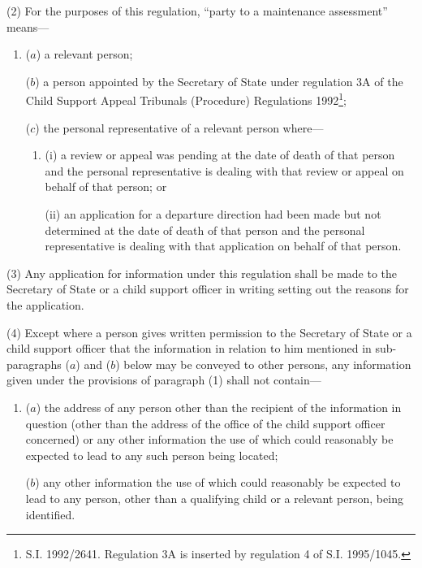 \documentclass[a4paper]{article}
\begin{document}
(2) For the purposes of this regulation, “party to a maintenance assessment” means—
\begin{enumerate}\item[]
($a$) a relevant person;

($b$) a person appointed by the Secretary of State under regulation 3A of the Child Support Appeal Tribunals (Procedure) Regulations 1992\footnote{\frenchspacing S.I. 1992/2641. Regulation 3A is inserted by regulation 4 of S.I. 1995/1045.};


($c$) the personal representative of a relevant person where—
\begin{enumerate}\item[]
(i) a review or appeal was pending at the date of death of that person and the personal representative is dealing with that review or appeal on behalf of that person; or

(ii) an application for a departure direction had been made but not determined at the date of death of that person and the personal representative is dealing with that application on behalf of that person.
\end{enumerate}
\end{enumerate}

(3) Any application for information under this regulation shall be made to the Secretary of State or a child support officer in writing setting out the reasons for the application.

(4) Except where a person gives written permission to the Secretary of State or a child support officer that the information in relation to him mentioned in sub-paragraphs ($a$) and ($b$) below may be conveyed to other persons, any information given under the provisions of paragraph (1) shall not contain—
\begin{enumerate}\item[]
($a$) the address of any person other than the recipient of the information in question (other than the address of the office of the child support officer concerned) or any other information the use of which could reasonably be expected to lead to any such person being located;

($b$) any other information the use of which could reasonably be expected to lead to any person, other than a qualifying child or a relevant person, being identified.
\end{enumerate}
\end{document}
